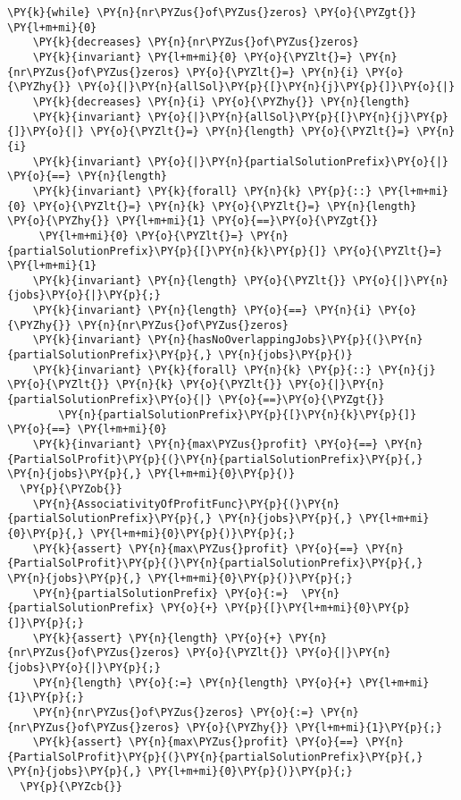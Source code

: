 \begin{footnotesize}
\begin{Verbatim}[commandchars=\\\{\}, fontsize=\footnotesize]
  \PY{k}{while} \PY{n}{nr\PYZus{}of\PYZus{}zeros} \PY{o}{\PYZgt{}} \PY{l+m+mi}{0}
    \PY{k}{decreases} \PY{n}{nr\PYZus{}of\PYZus{}zeros}
    \PY{k}{invariant} \PY{l+m+mi}{0} \PY{o}{\PYZlt{}=} \PY{n}{nr\PYZus{}of\PYZus{}zeros} \PY{o}{\PYZlt{}=} \PY{n}{i} \PY{o}{\PYZhy{}} \PY{o}{|}\PY{n}{allSol}\PY{p}{[}\PY{n}{j}\PY{p}{]}\PY{o}{|} 
    \PY{k}{decreases} \PY{n}{i} \PY{o}{\PYZhy{}} \PY{n}{length}
    \PY{k}{invariant} \PY{o}{|}\PY{n}{allSol}\PY{p}{[}\PY{n}{j}\PY{p}{]}\PY{o}{|} \PY{o}{\PYZlt{}=} \PY{n}{length} \PY{o}{\PYZlt{}=} \PY{n}{i} 
    \PY{k}{invariant} \PY{o}{|}\PY{n}{partialSolutionPrefix}\PY{o}{|} \PY{o}{==} \PY{n}{length}
    \PY{k}{invariant} \PY{k}{forall} \PY{n}{k} \PY{p}{::} \PY{l+m+mi}{0} \PY{o}{\PYZlt{}=} \PY{n}{k} \PY{o}{\PYZlt{}=} \PY{n}{length} \PY{o}{\PYZhy{}} \PY{l+m+mi}{1} \PY{o}{==}\PY{o}{\PYZgt{}}
     \PY{l+m+mi}{0} \PY{o}{\PYZlt{}=} \PY{n}{partialSolutionPrefix}\PY{p}{[}\PY{n}{k}\PY{p}{]} \PY{o}{\PYZlt{}=} \PY{l+m+mi}{1}
    \PY{k}{invariant} \PY{n}{length} \PY{o}{\PYZlt{}} \PY{o}{|}\PY{n}{jobs}\PY{o}{|}\PY{p}{;}
    \PY{k}{invariant} \PY{n}{length} \PY{o}{==} \PY{n}{i} \PY{o}{\PYZhy{}} \PY{n}{nr\PYZus{}of\PYZus{}zeros}
    \PY{k}{invariant} \PY{n}{hasNoOverlappingJobs}\PY{p}{(}\PY{n}{partialSolutionPrefix}\PY{p}{,} \PY{n}{jobs}\PY{p}{)}
    \PY{k}{invariant} \PY{k}{forall} \PY{n}{k} \PY{p}{::} \PY{n}{j} \PY{o}{\PYZlt{}} \PY{n}{k} \PY{o}{\PYZlt{}} \PY{o}{|}\PY{n}{partialSolutionPrefix}\PY{o}{|} \PY{o}{==}\PY{o}{\PYZgt{}} 
        \PY{n}{partialSolutionPrefix}\PY{p}{[}\PY{n}{k}\PY{p}{]} \PY{o}{==} \PY{l+m+mi}{0}
    \PY{k}{invariant} \PY{n}{max\PYZus{}profit} \PY{o}{==} \PY{n}{PartialSolProfit}\PY{p}{(}\PY{n}{partialSolutionPrefix}\PY{p}{,} \PY{n}{jobs}\PY{p}{,} \PY{l+m+mi}{0}\PY{p}{)}
  \PY{p}{\PYZob{}}
    \PY{n}{AssociativityOfProfitFunc}\PY{p}{(}\PY{n}{partialSolutionPrefix}\PY{p}{,} \PY{n}{jobs}\PY{p}{,} \PY{l+m+mi}{0}\PY{p}{,} \PY{l+m+mi}{0}\PY{p}{)}\PY{p}{;} 
    \PY{k}{assert} \PY{n}{max\PYZus{}profit} \PY{o}{==} \PY{n}{PartialSolProfit}\PY{p}{(}\PY{n}{partialSolutionPrefix}\PY{p}{,} \PY{n}{jobs}\PY{p}{,} \PY{l+m+mi}{0}\PY{p}{)}\PY{p}{;}
    \PY{n}{partialSolutionPrefix} \PY{o}{:=}  \PY{n}{partialSolutionPrefix} \PY{o}{+} \PY{p}{[}\PY{l+m+mi}{0}\PY{p}{]}\PY{p}{;}
    \PY{k}{assert} \PY{n}{length} \PY{o}{+} \PY{n}{nr\PYZus{}of\PYZus{}zeros} \PY{o}{\PYZlt{}} \PY{o}{|}\PY{n}{jobs}\PY{o}{|}\PY{p}{;}
    \PY{n}{length} \PY{o}{:=} \PY{n}{length} \PY{o}{+} \PY{l+m+mi}{1}\PY{p}{;}
    \PY{n}{nr\PYZus{}of\PYZus{}zeros} \PY{o}{:=} \PY{n}{nr\PYZus{}of\PYZus{}zeros} \PY{o}{\PYZhy{}} \PY{l+m+mi}{1}\PY{p}{;}
    \PY{k}{assert} \PY{n}{max\PYZus{}profit} \PY{o}{==} \PY{n}{PartialSolProfit}\PY{p}{(}\PY{n}{partialSolutionPrefix}\PY{p}{,} \PY{n}{jobs}\PY{p}{,} \PY{l+m+mi}{0}\PY{p}{)}\PY{p}{;}
  \PY{p}{\PYZcb{}}


\end{Verbatim}
\end{footnotesize}
